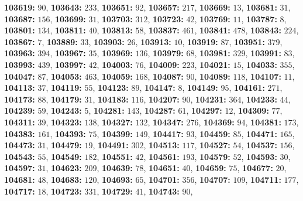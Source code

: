 \textsf{\bfseries 103619:} $90$, \textsf{\bfseries 103643:} $233$, \textsf{\bfseries 103651:} $92$, \textsf{\bfseries 103657:} $217$, \textsf{\bfseries 103669:} $13$, \textsf{\bfseries 103681:} $31$, \textsf{\bfseries 103687:} $156$, \textsf{\bfseries 103699:} $31$, \textsf{\bfseries 103703:} $312$, \textsf{\bfseries 103723:} $42$, \textsf{\bfseries 103769:} $11$, \textsf{\bfseries 103787:} $8$, \textsf{\bfseries 103801:} $134$, \textsf{\bfseries 103811:} $40$, \textsf{\bfseries 103813:} $58$, \textsf{\bfseries 103837:} $461$, \textsf{\bfseries 103841:} $478$, \textsf{\bfseries 103843:} $224$, \textsf{\bfseries 103867:} $7$, \textsf{\bfseries 103889:} $33$, \textsf{\bfseries 103903:} $26$, \textsf{\bfseries 103913:} $10$, \textsf{\bfseries 103919:} $87$, \textsf{\bfseries 103951:} $379$, \textsf{\bfseries 103963:} $394$, \textsf{\bfseries 103967:} $35$, \textsf{\bfseries 103969:} $136$, \textsf{\bfseries 103979:} $68$, \textsf{\bfseries 103981:} $329$, \textsf{\bfseries 103991:} $83$, \textsf{\bfseries 103993:} $439$, \textsf{\bfseries 103997:} $42$, \textsf{\bfseries 104003:} $76$, \textsf{\bfseries 104009:} $223$, \textsf{\bfseries 104021:} $15$, \textsf{\bfseries 104033:} $355$, \textsf{\bfseries 104047:} $87$, \textsf{\bfseries 104053:} $463$, \textsf{\bfseries 104059:} $168$, \textsf{\bfseries 104087:} $90$, \textsf{\bfseries 104089:} $118$, \textsf{\bfseries 104107:} $11$, \textsf{\bfseries 104113:} $37$, \textsf{\bfseries 104119:} $55$, \textsf{\bfseries 104123:} $89$, \textsf{\bfseries 104147:} $8$, \textsf{\bfseries 104149:} $95$, \textsf{\bfseries 104161:} $271$, \textsf{\bfseries 104173:} $88$, \textsf{\bfseries 104179:} $31$, \textsf{\bfseries 104183:} $116$, \textsf{\bfseries 104207:} $90$, \textsf{\bfseries 104231:} $364$, \textsf{\bfseries 104233:} $44$, \textsf{\bfseries 104239:} $59$, \textsf{\bfseries 104243:} $5$, \textsf{\bfseries 104281:} $143$, \textsf{\bfseries 104287:} $61$, \textsf{\bfseries 104297:} $12$, \textsf{\bfseries 104309:} $77$, \textsf{\bfseries 104311:} $39$, \textsf{\bfseries 104323:} $138$, \textsf{\bfseries 104327:} $132$, \textsf{\bfseries 104347:} $276$, \textsf{\bfseries 104369:} $94$, \textsf{\bfseries 104381:} $173$, \textsf{\bfseries 104383:} $161$, \textsf{\bfseries 104393:} $75$, \textsf{\bfseries 104399:} $149$, \textsf{\bfseries 104417:} $93$, \textsf{\bfseries 104459:} $85$, \textsf{\bfseries 104471:} $165$, \textsf{\bfseries 104473:} $31$, \textsf{\bfseries 104479:} $19$, \textsf{\bfseries 104491:} $302$, \textsf{\bfseries 104513:} $117$, \textsf{\bfseries 104527:} $54$, \textsf{\bfseries 104537:} $156$, \textsf{\bfseries 104543:} $55$, \textsf{\bfseries 104549:} $182$, \textsf{\bfseries 104551:} $42$, \textsf{\bfseries 104561:} $193$, \textsf{\bfseries 104579:} $52$, \textsf{\bfseries 104593:} $30$, \textsf{\bfseries 104597:} $31$, \textsf{\bfseries 104623:} $209$, \textsf{\bfseries 104639:} $78$, \textsf{\bfseries 104651:} $40$, \textsf{\bfseries 104659:} $75$, \textsf{\bfseries 104677:} $20$, \textsf{\bfseries 104681:} $48$, \textsf{\bfseries 104683:} $120$, \textsf{\bfseries 104693:} $65$, \textsf{\bfseries 104701:} $356$, \textsf{\bfseries 104707:} $109$, \textsf{\bfseries 104711:} $177$, \textsf{\bfseries 104717:} $18$, \textsf{\bfseries 104723:} $331$, \textsf{\bfseries 104729:} $41$, \textsf{\bfseries 104743:} $90$, 
